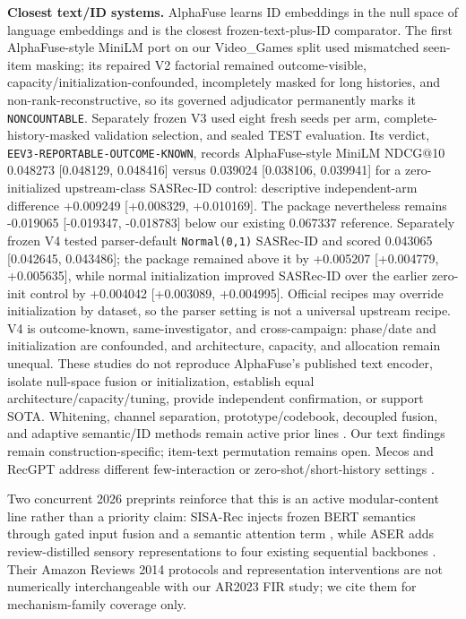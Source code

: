 \textbf{Closest text/ID systems.} AlphaFuse \citep{hu2025alphafuse} learns ID embeddings in the null space of language embeddings and is the closest frozen-text-plus-ID comparator. The first AlphaFuse-style MiniLM port on our Video\_Games split used mismatched seen-item masking; its repaired V2 factorial remained outcome-visible, capacity/initialization-confounded, incompletely masked for long histories, and non-rank-reconstructive, so its governed adjudicator permanently marks it \texttt{NONCOUNTABLE}. Separately frozen V3 used eight fresh seeds per arm, complete-history-masked validation selection, and sealed TEST evaluation. Its verdict, \texttt{EEV3-REPORTABLE-OUTCOME-KNOWN}, records AlphaFuse-style MiniLM NDCG@10 0.048273 [0.048129, 0.048416] versus 0.039024 [0.038106, 0.039941] for a zero-initialized upstream-class SASRec-ID control: descriptive independent-arm difference +0.009249 [+0.008329, +0.010169]. The package nevertheless remains -0.019065 [-0.019347, -0.018783] below our existing 0.067337 reference. Separately frozen V4 tested parser-default \texttt{Normal(0,1)} SASRec-ID and scored 0.043065 [0.042645, 0.043486]; the package remained above it by +0.005207 [+0.004779, +0.005635], while normal initialization improved SASRec-ID over the earlier zero-init control by +0.004042 [+0.003089, +0.004995]. Official recipes may override initialization by dataset, so the parser setting is not a universal upstream recipe. V4 is outcome-known, same-investigator, and cross-campaign: phase/date and initialization are confounded, and architecture, capacity, and allocation remain unequal. These studies do not reproduce AlphaFuse's published text encoder, isolate null-space fusion or initialization, establish equal architecture/capacity/tuning, provide independent confirmation, or support SOTA. Whitening, channel separation, prototype/codebook, decoupled fusion, and adaptive semantic/ID methods remain active prior lines \citep{zhang2024dwsrec,zhou2026sidsrec,hu2026bfdrec,lee2026ace,zhang2026llmsqrec,liu2021nova,xie2022difsr,xu2024tedrec,li2025alterrec,liu2024llmesr,wei2026faerec,he2025llm2rec}. Our text findings remain construction-specific; item-text permutation remains open. Mecos and RecGPT address different few-interaction or zero-shot/short-history settings \citep{zheng2021mecos,jiang2025recgpt}.

Two concurrent 2026 preprints reinforce that this is an active modular-content line rather than a priority claim: SISA-Rec injects frozen BERT semantics through gated input fusion and a semantic attention term \citep{abbasi2026sisarec}, while ASER adds review-distilled sensory representations to four existing sequential backbones \citep{yoon2026aser}. Their Amazon Reviews 2014 protocols and representation interventions are not numerically interchangeable with our AR2023 FIR study; we cite them for mechanism-family coverage only.

